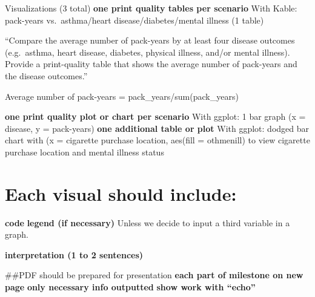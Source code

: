 \documentclass[
]{article}
\begin{document}
Visualizations (3 total) \textbf{one print quality tables per scenario}
With Kable: pack-years vs.~asthma/heart disease/diabetes/mental illness
(1 table)

``Compare the average number of pack-years by at least four disease
outcomes (e.g.~asthma, heart disease, diabetes, physical illness, and/or
mental illness). Provide a print-quality table that shows the average
number of pack-years and the disease outcomes.''

Average number of pack-years = pack\_years/sum(pack\_years)

\textbf{one print quality plot or chart per scenario} With ggplot: 1 bar
graph (x = disease, y = pack-years) \textbf{one additional table or
plot} With ggplot: dodged bar chart with (x = cigarette purchase
location, aes(fill = othmenill) to view cigarette purchase location and
mental illness status

\hypertarget{each-visual-should-include}{%
\section{Each visual should include:}\label{each-visual-should-include}}

\textbf{code} \textbf{legend (if necessary) } Unless we decide to input
a third variable in a graph.

\textbf{interpretation (1 to 2 sentences)}

\#\#PDF should be prepared for presentation \textbf{each part of
milestone on new page} \textbf{only necessary info outputted}
\textbf{show work with ``echo''}
\end{document}
